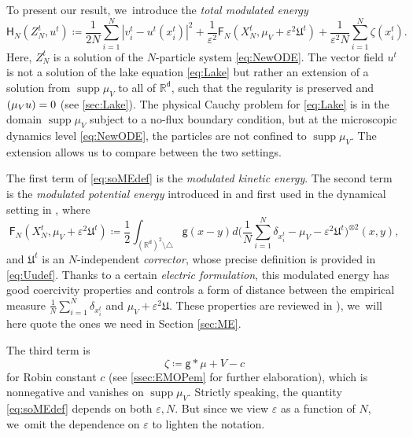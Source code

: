 \documentclass[10pt]{amsart}
\theoremstyle{plain}
\theoremstyle{definition}
\DeclareMathOperator{\supp}{supp}
\let\div\relax
\DeclareMathOperator{\div}{\mathrm{div}}
\newcommand{\R}{{\mathbb{R}}}
\let\vep\varepsilon
\let\ux X
\let\uz Z
\newcommand{\Uu}{\mathfrak{U}}
\newcommand{\Fr}{\mathsf{F}}
\newcommand{\Hr}{\mathsf{H}}
\renewcommand{\d}{\mathsf{d}}
\newcommand{\g}{{\mathsf{g}}}
\begin{document}
To present our result, we~introduce the \emph{total modulated energy}
\begin{equation}\label{eq:soMEdef}
\Hr_{N}(\uz_N^t, u^t) \coloneqq \frac{1}{2N}\sum_{i=1}^N |v_i^t-u^t(x_i^t)|^2 + \frac{1}{\vep^2}\Fr_N(\ux_N^t,\mu_V+\vep^2\Uu^t) + \frac{1}{\vep^2 N}\sum_{i=1}^N \zeta(x_i^t).
\end{equation}
Here, $\uz_N^t$ is a solution of the $N$-particle system \eqref{eq:NewODE}. The vector field $u^t$ is not a solution of the lake equation \eqref{eq:Lake} but rather an extension of a solution from $\supp \mu_V $ to all of $\R^\d$, such that the regularity is preserved and $\div(\mu_V u) = 0$ (see \cref{sec:Lake}). The physical Cauchy problem for \eqref{eq:Lake} is in the domain $\supp\mu_V$ subject to a no-flux boundary condition, but at the microscopic dynamics level \eqref{eq:NewODE}, the particles are not confined to $\supp\mu_V$. The extension allows us to compare between the two settings.

The first term of \eqref{eq:soMEdef} is the \emph{modulated kinetic energy}. The second term is the \emph{modulated potential energy} { introduced in \cite{SS2015,PS2017} and first used in the dynamical setting in \cite{Duerinckx2016, Serfaty2020},} where
\begin{equation}\label{eq:introMPEdef}
\Fr_N(X_N^t,\mu_V+\vep^2\Uu^t) \coloneqq \frac12\int_{(\R^\d)^2\setminus\triangle}\g(x-y)d\Big(\frac1N\sum_{i=1}^N\delta_{x_i^t} - \mu_V - \vep^2\Uu^t\Big)^{\otimes 2}(x,y),
\end{equation}
{and $\Uu^t$ is an $N$-independent \emph{corrector}, whose precise definition is provided in \eqref{eq:Uudef}.
Thanks to a certain {\it electric formulation}, this modulated energy has good coercivity properties and controls a form of distance between the empirical measure $\frac1N \sum_{i=1}^N \delta_{x_i^t} $ and $\mu_V+\vep^2 \Uu$. These properties are reviewed in \cite[Chap.\,4]{SerfatyLN}), we~will here quote the ones we need in Section \ref{sec:ME}.}

The third term is
\begin{equation}\label{eq:introzetadef}
\zeta\coloneqq \g\ast\mu + V - c
\end{equation}
for Robin constant $c$ (see \cref{ssec:EMOPem} for further elaboration), {which is nonnegative and vanishes on $\supp \mu_V$}. Strictly speaking, the quantity \eqref{eq:soMEdef} depends on both $\vep,N$. But since we view $\vep$ as a function of $N$, we~omit the dependence on $\vep$ to lighten the notation.
\end{document}
